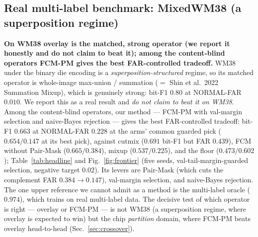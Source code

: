 \documentclass[11pt]{article}
\begin{document}
\subsection{Real multi-label benchmark: MixedWM38 (a superposition regime)}
\textbf{On WM38 overlay is the matched, strong operator (we report it honestly and do
not claim to beat it); among the content-blind operators FCM-PM gives the best
FAR-controlled tradeoff.} WM38 under the binary die encoding is a
\emph{superposition-structured} regime, so its matched operator is whole-image
max-union / summation ($=$ Shin et al.\ 2022 Summation Mixup), which is genuinely
strong: bit-F1 $0.80$ at NORMAL-FAR $0.010$. We report this as a real result and
\emph{do not claim to beat it on WM38}. Among the content-blind operators, our method
--- FCM-PM with val-margin selection and naive-Bayes rejection --- gives the best
FAR-controlled tradeoff: bit-F1 $0.663$ at NORMAL-FAR $0.228$ at the arms' common
guarded pick ($0.654/0.147$ at its best pick), against cutmix ($0.691$ bit-F1 but FAR
$0.439$), FCM without Pair-Mask ($0.665/0.384$), mixup ($0.537/0.225$), and the floor
($0.473/0.602$); Table~\ref{tab:headline} and Fig.~\ref{fig:frontier} (five seeds,
val-tail-margin-guarded selection, negative target $0.02$). Its levers are Pair-Mask
(which cuts the complement FAR $0.384\to0.147$), val-margin selection, and naive-Bayes
rejection. The one upper reference we cannot admit as a method is the multi-label
oracle ($0.974$), which trains on real multi-label data. The decisive test of which
operator is right --- overlay or FCM-PM --- is not WM38 (a superposition regime, where
overlay is expected to win) but the chip \emph{partition} domain, where FCM-PM beats
overlay head-to-head (Sec.~\ref{sec:crossover}).
\end{document}
